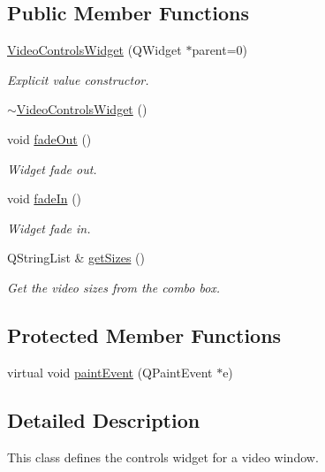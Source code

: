 \subsection*{Public Member Functions}
\begin{DoxyCompactItemize}
\item 
\hyperlink{classVideoControlsWidget_ac0873fb8672cefc5f6549cac23e57757}{Video\-Controls\-Widget} (Q\-Widget $\ast$parent=0)
\begin{DoxyCompactList}\small\item\em Explicit value constructor. \end{DoxyCompactList}\item 
\hyperlink{classVideoControlsWidget_a6b85a92f3e656f11f48cdc580c2b4e0a}{$\sim$\-Video\-Controls\-Widget} ()
\item 
void \hyperlink{classVideoControlsWidget_aa7a0e5cf6d96db502d1826ec9ed43afa}{fade\-Out} ()
\begin{DoxyCompactList}\small\item\em Widget fade out. \end{DoxyCompactList}\item 
void \hyperlink{classVideoControlsWidget_a6fee9a987ad66923a326754e227019cc}{fade\-In} ()
\begin{DoxyCompactList}\small\item\em Widget fade in. \end{DoxyCompactList}\item 
Q\-String\-List \& \hyperlink{classVideoControlsWidget_a81dd786a6a95c6a5ed0ad9ea06c06f70}{get\-Sizes} ()
\begin{DoxyCompactList}\small\item\em Get the video sizes from the combo box. \end{DoxyCompactList}\end{DoxyCompactItemize}
\subsection*{Protected Member Functions}
\begin{DoxyCompactItemize}
\item 
virtual void \hyperlink{classVideoControlsWidget_a733c88f42e0cdec6b6209c97cb2391ed}{paint\-Event} (Q\-Paint\-Event $\ast$e)
\end{DoxyCompactItemize}


\subsection{Detailed Description}
This class defines the controls widget for a video window. 

